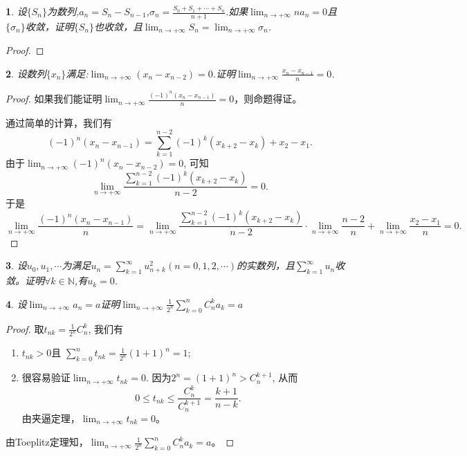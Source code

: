 \documentclass[utf8]{book}
\newtheorem{example}{}[section]             %
\begin{document}
\begin{example}
设$\{S_n\}$为数列,$a_n=S_n-S_{n-1}$,$\sigma_n = \displaystyle\frac{S_0+S_1+\cdots+S_n}{n+1}$.如果$\displaystyle\lim_{n\to +\infty}na_n=0$且$\{\sigma_n\}$收敛，证明$\{S_n\}$也收敛，且$\displaystyle\lim_{n\to +\infty}S_n = \displaystyle\lim_{n\to +\infty}\sigma_n$.
\end{example}
\begin{proof}

\end{proof}
\begin{example}
设数列$\{x_n\}$满足:$\displaystyle\lim_{n\to +\infty}(x_n-x_{n-2})=0$.证明$\displaystyle\lim_{n\to +\infty}\frac{x_n-x_{n-1}}{n} = 0$.
\end{example}
\begin{proof}如果我们能证明$\displaystyle\lim_{n\to +\infty}\frac{\left(-1\right)^n\left(x_n-x_{n-1}\right)}{n} = 0$，则命题得证。

通过简单的计算，我们有
$$\left(-1\right)^n\left(x_n-x_{n-1}\right) = \sum_{k=1}^{n-2}(-1)^k(x_{k+2}-x_k)+x_2-x_1.$$
由于$\displaystyle\lim_{n\to +\infty}(-1)^n(x_n-x_{n-2})=0$, 可知
$$\lim_{n\to +\infty}\displaystyle\frac{\displaystyle\sum_{k=1}^{n-2}(-1)^k(x_{k+2}-x_k)}{n-2} = 0.$$
于是
$$\displaystyle\lim_{n\to +\infty}\frac{\left(-1\right)^n\left(x_n-x_{n-1}\right)}{n}=\lim_{n\to +\infty}\displaystyle\frac{\displaystyle\sum_{k=1}^{n-2}(-1)^k(x_{k+2}-x_k)}{n-2}\cdot \lim_{n\to +\infty}\frac{n-2}{n}+\lim_{n\to +\infty}\frac{x_2-x_1}{n} = 0.$$
\end{proof}
\begin{example}
设$u_0,u_1,\cdots$为满足$u_n=\displaystyle\sum_{k=1}^{\infty}u^2_{n+k}(n=0,1,2,\cdots)$的实数列，且$\displaystyle\sum_{k=1}^{\infty}u_{n}$收敛。证明$\forall k\in\mathbb{N}$,有$u_k=0$.
\end{example}
\begin{example}
设$\displaystyle\lim_{n\to +\infty}a_n =a$证明$\displaystyle\lim_{n\to +\infty}\frac{1}{2^n}\displaystyle\sum_{k=0}^nC_n^ka_k =a$
\end{example}
\begin{proof}
取$t_{nk} = \frac{1}{2^n}C_n^k$, 我们有
\renewcommand\labelenumi{\normalfont(\theenumi)}
\begin{enumerate}
\item $t_{nk} > 0$且 $\displaystyle\sum_{k=0}^nt_{nk} = \frac{1}{2^n}(1+1)^n = 1$;
\item 很容易验证$\displaystyle\lim_{n\to +\infty}t_{nk} = 0$. 因为$2^n=(1+1)^n > C_n^{k+1}$, 从而
$$0\leq t_{nk} \leq \frac{C_n^k}{C_n^{k+1}} = \frac{k+1}{n-k}.$$
由夹逼定理，$\displaystyle\lim_{n\to +\infty}t_{nk} = 0$。
\end{enumerate}
由Toeplitz定理知，$\displaystyle\lim_{n\to +\infty}\frac{1}{2^n}\displaystyle\sum_{k=0}^nC_n^ka_k =a$。
\end{proof}
\end{document}
